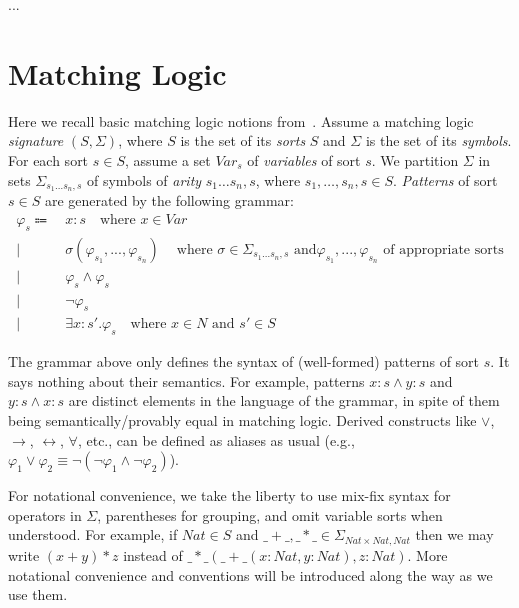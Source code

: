 \documentclass[UTF8,11pt]{article}
\theoremstyle{plain}
\theoremstyle{definition}
\theoremstyle{remark}
\newcommand{\cln}{{:}}
\newcommand{\Nat}{\textit{Nat}}
\begin{document}
...

\section{Matching Logic}
\label{sec:matching-logic}

\newcommand{\Var}{\textit{Var}}

Here we recall basic matching logic notions from~\cite{rosu-2017-lmcs}.
Assume a matching logic \emph{signature} $(S, \Sigma)$, where $S$ is the
set of its \emph{sorts} $S$ and $\Sigma$ is the set of its \emph{symbols}.
For each sort $s \in S$, assume a set $\Var_s$ of \emph{variables} of
sort $s$.
We partition $\Sigma$ in sets $\Sigma_{s_1 \ldots s_n, s}$ of symbols
of \emph{arity} $s_1\ldots s_n,s$, where
$s_1,\ldots, s_n, s \in S$.
\emph{Patterns} of sort $s \in S$ are generated by the following grammar:
\begin{align*}
\varphi_s \Coloneqq\  &x \cln s \quad \text{where $x \in \Var$} \\
\mid\  &\sigma(\varphi_{s_1},...,\varphi_{s_n}) \quad\
\text{where $\sigma \in \Sigma_{s_1 \ldots s_n, s}$ and
$\varphi_{s_1},...,\varphi_{s_n}$ of appropriate sorts} \\
\mid\  &\varphi_s \wedge \varphi_s \\
\mid\  &\neg \varphi_s \\
\mid\  &\exists x \cln s' . \varphi_s \quad \text{where $x \in N$ and $s' \in S$}
\end{align*}
\begingroup\vspace*{-\baselineskip}
\label{ml-grammar}
\vspace*{\baselineskip}\endgroup

The grammar above only defines the syntax of (well-formed) patterns of sort
$s$.
It says nothing about their semantics.
For example, patterns $x\cln s \wedge y \cln s$ and
$y\cln s \wedge x \cln s$ are distinct elements in the language
of the grammar, in spite of them being semantically/provably equal
in matching logic.
Derived constructs like $\vee$, $\rightarrow$, $\leftrightarrow$,
$\forall$, etc., can be defined as aliases as usual (e.g.,
$\varphi_1 \vee \varphi_2 \equiv \neg(\neg \varphi_1 \wedge \neg\varphi_2)$).

For notational convenience, we take the liberty to use mix-fix syntax for
operators in $\Sigma$,
parentheses for grouping, and omit variable sorts when understood.
For example, if $\Nat \in S$ and
$\_+\_, \_*\_ \in \Sigma_{\Nat \times \Nat, \Nat}$
then we may write $(x + y)*z$ instead of
$\_*\_(\_+\_(x\cln\Nat,y\cln\Nat),z\cln\Nat)$.
More notational convenience and conventions will be introduced along the way
as we use them. 
\end{document}
